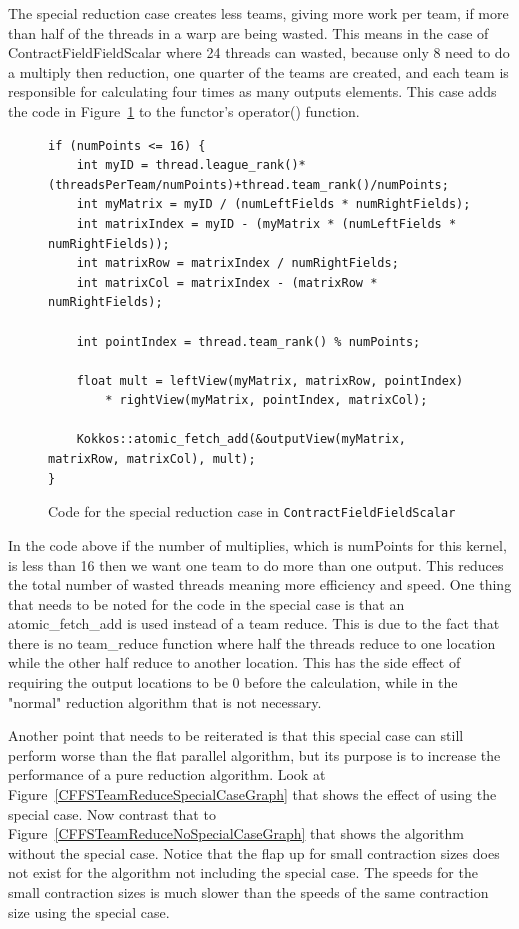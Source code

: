 The special reduction case creates less teams, giving more work per team, if
more than half of the threads in a warp are being wasted. This means in the
case of ContractFieldFieldScalar where 24 threads can wasted, because only 8
need to do a multiply then reduction, one quarter of the teams are created, and
each team is responsible for calculating four times as many outputs elements.
This case adds the code in
Figure~\ref{lst:ContractFieldFieldScalarReductionSpecialCase} to the functor's
operator() function. \\
\begin{figure}[!ht]
    \begin{lstlisting}
if (numPoints <= 16) {	
	int myID = thread.league_rank()*(threadsPerTeam/numPoints)+thread.team_rank()/numPoints;
	int myMatrix = myID / (numLeftFields * numRightFields);
	int matrixIndex = myID - (myMatrix * (numLeftFields * numRightFields));
	int matrixRow = matrixIndex / numRightFields;
	int matrixCol = matrixIndex - (matrixRow * numRightFields);

	int pointIndex = thread.team_rank() % numPoints;

	float mult = leftView(myMatrix, matrixRow, pointIndex) 
		* rightView(myMatrix, pointIndex, matrixCol);

	Kokkos::atomic_fetch_add(&outputView(myMatrix, matrixRow, matrixCol), mult);
}
    \end{lstlisting}
\caption{Code for the special reduction case in \texttt{ContractFieldFieldScalar}
\label{lst:ContractFieldFieldScalarReductionSpecialCase}} 
\end{figure}

In the code above if the number of multiplies, which is numPoints for this
kernel, is less than 16 then we want one team to do more than one output. This
reduces the total number of wasted threads meaning more efficiency and speed.
One thing that needs to be noted for the code in the special case is that an
atomic\_fetch\_add is used instead of a team reduce. This is due to the fact
that there is no team\_reduce function where half the threads reduce to one
location while the other half reduce to another location. This has the side
effect of requiring the output locations to be 0 before the calculation, while
in the "normal" reduction algorithm that is not necessary. 

Another point that needs to be reiterated is that this special case can still
perform worse than the flat parallel algorithm, but its purpose is to increase
the performance of a pure reduction algorithm. Look at
Figure~\ref{CFFSTeamReduceSpecialCaseGraph} that shows the effect of using the
special case. Now contrast that to
Figure~\ref{CFFSTeamReduceNoSpecialCaseGraph} that shows the algorithm without
the special case. Notice that the flap up for small contraction sizes does not
exist for the algorithm not including the special case. The speeds for the
small contraction sizes is much slower than the speeds of the same contraction
size using the special case.

